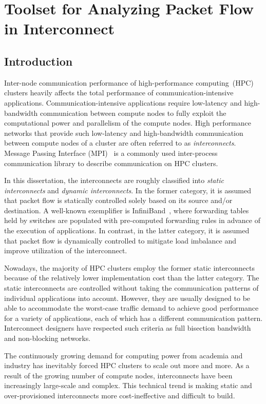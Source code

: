 \chapter{Toolset for Analyzing Packet Flow in Interconnect}\label{sec:ii}

\section{Introduction}\label{sec:ii-introduction}

Inter-node communication performance of high-performance computing~(HPC)
clusters heavily affects the total performance of
communication-intensive applications. Communication-intensive
applications require low-latency and high-bandwidth communication
between compute nodes to fully exploit the computational power and
parallelism of the compute nodes. High performance networks that
provide such low-latency and high-bandwidth communication between
compute nodes of a cluster are often referred to as
\emph{interconnects}. Message Passing Interface
(MPI)~\autocite{MessagePassingInterfaceForum2015,Gropp2014} is a
commonly used inter-process communication library to describe
communication on HPC clusters.

In this dissertation, the interconnects are roughly classified into
\emph{static interconnects} and \emph{dynamic interconnects}. In the former
category, it is assumed that packet flow is statically controlled solely based
on its source and/or destination. A well-known exemplifier is
InfiniBand~\autocite{Buyya2009}, where forwarding tables held by switches are
populated with pre-computed forwarding rules in advance of the execution of
applications. In contrast, in the latter category, it is assumed that packet
flow is dynamically controlled to mitigate load imbalance and improve
utilization of the interconnect.

Nowadays, the majority of HPC clusters employ the former static
interconnects because of the relatively lower implementation cost than the
latter category. The static interconnects are controlled without taking the
communication patterns of individual applications into account. However, they
are usually designed to be able to accommodate the worst-case traffic demand
to achieve good performance for a variety of applications, each of which has a
different communication pattern. Interconnect designers have respected such
criteria as full bisection bandwidth and non-blocking networks.

The continuously growing demand for computing power from academia and
industry has inevitably forced HPC clusters to scale out more and more.
As a result of the growing number of compute nodes, interconnects
have been increasingly large-scale and complex. This technical trend is making
static and over-provisioned interconnects more cost-ineffective and
difficult to build.

